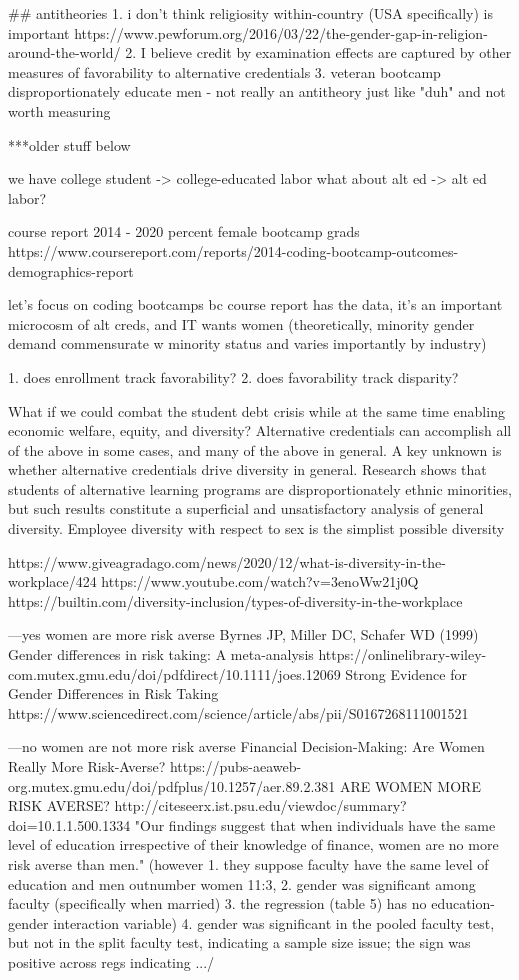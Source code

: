 \documentclass[review]{elsarticle}
\begin{document}
## antitheories
1. i don't think religiosity within-country (USA specifically) is important https://www.pewforum.org/2016/03/22/the-gender-gap-in-religion-around-the-world/
2. I believe credit by examination effects are captured by other measures of favorability to alternative credentials
3. veteran bootcamp disproportionately educate men - not really an antitheory just like "duh" and not worth measuring

***older stuff below


we have college student -> college-educated labor
what about alt ed -> alt ed labor?

course report 2014 - 2020 percent female bootcamp grads
https://www.coursereport.com/reports/2014-coding-bootcamp-outcomes-demographics-report

let's focus on coding bootcamps bc course report has the data, it's an important microcosm of alt creds, and IT wants women
(theoretically, minority gender demand commensurate w minority status and varies importantly by industry)

1. does enrollment track favorability?
2. does favorability track disparity?

What if we could combat the student debt crisis while at the same time enabling economic welfare, equity, and diversity?
Alternative credentials can accomplish all of the above in some cases, and many of the above in general.
A key unknown is whether alternative credentials drive diversity in general.
Research shows that students of alternative learning programs are disproportionately ethnic minorities, %
but such results constitute a superficial and unsatisfactory analysis of general diversity.
Employee diversity with respect to sex is the simplist possible diversity

https://www.giveagradago.com/news/2020/12/what-is-diversity-in-the-workplace/424
https://www.youtube.com/watch?v=3enoWw21j0Q
https://builtin.com/diversity-inclusion/types-of-diversity-in-the-workplace

---yes women are more risk averse
Byrnes JP, Miller DC, Schafer WD (1999) Gender differences in risk taking: A meta-analysis
https://onlinelibrary-wiley-com.mutex.gmu.edu/doi/pdfdirect/10.1111/joes.12069
Strong Evidence for Gender Differences in Risk Taking https://www.sciencedirect.com/science/article/abs/pii/S0167268111001521



---no women are not more risk averse
Financial Decision-Making: Are Women Really
More Risk-Averse? https://pubs-aeaweb-org.mutex.gmu.edu/doi/pdfplus/10.1257/aer.89.2.381
ARE WOMEN MORE RISK AVERSE? http://citeseerx.ist.psu.edu/viewdoc/summary?doi=10.1.1.500.1334
"Our findings suggest that when individuals have the same level of education irrespective of their
knowledge of finance, women are no more risk averse than men." (however
1. they suppose faculty have the same level of education and men outnumber women 11:3,
2. gender was significant among faculty (specifically when married)
3. the regression (table 5) has no education-gender interaction variable)
4. gender was significant in the pooled faculty test, but not in the split faculty test, indicating a sample size issue; the sign was positive across regs indicating
.../
\end{document}
